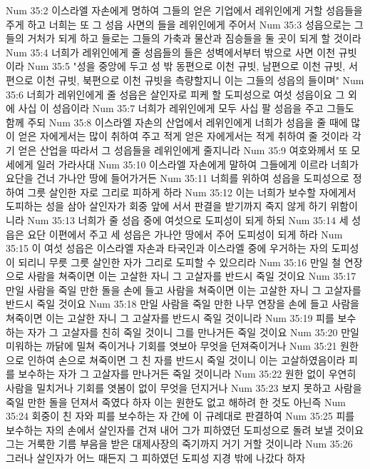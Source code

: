 Num 35:2  이스라엘 자손에게 명하여 그들의 얻은 기업에서 레위인에게 거할 성읍들을 주게 하고 너희는 또 그 성읍 사면의 들을 레위인에게 주어서
Num 35:3  성읍으로는 그들의 거처가 되게 하고 들로는 그들의 가축과 물산과 짐승들을 둘 곳이 되게 할 것이라
Num 35:4  너희가 레위인에게 줄 성읍들의 들은 성벽에서부터 밖으로 사면 이천 규빗이라
Num 35:5  "성을 중앙에 두고 성 밖 동편으로 이천 규빗, 남편으로 이천 규빗, 서편으로 이천 규빗, 북편으로 이천 규빗을 측량할지니 이는 그들의 성읍의 들이며"
Num 35:6  너희가 레위인에게 줄 성읍은 살인자로 피케 할 도피성으로 여섯 성읍이요 그 외에 사십 이 성읍이라
Num 35:7  너희가 레위인에게 모두 사십 팔 성읍을 주고 그들도 함께 주되
Num 35:8  이스라엘 자손의 산업에서 레위인에게 너희가 성읍을 줄 때에 많이 얻은 자에게서는 많이 취하여 주고 적게 얻은 자에게서는 적게 취하여 줄 것이라 각기 얻은 산업을 따라서 그 성읍들을 레위인에게 줄지니라
Num 35:9  여호와께서 또 모세에게 일러 가라사대
Num 35:10  이스라엘 자손에게 말하여 그들에게 이르라 너희가 요단을 건너 가나안 땅에 들어가거든
Num 35:11  너희를 위하여 성읍을 도피성으로 정하여 그릇 살인한 자로 그리로 피하게 하라
Num 35:12  이는 너희가 보수할 자에게서 도피하는 성을 삼아 살인자가 회중 앞에 서서 판결을 받기까지 죽지 않게 하기 위함이니라
Num 35:13  너희가 줄 성읍 중에 여섯으로 도피성이 되게 하되
Num 35:14  세 성읍은 요단 이편에서 주고 세 성읍은 가나안 땅에서 주어 도피성이 되게 하라
Num 35:15  이 여섯 성읍은 이스라엘 자손과 타국인과 이스라엘 중에 우거하는 자의 도피성이 되리니 무릇 그릇 살인한 자가 그리로 도피할 수 있으리라
Num 35:16  만일 철 연장으로 사람을 쳐죽이면 이는 고살한 자니 그 고살자를 반드시 죽일 것이요
Num 35:17  만일 사람을 죽일 만한 돌을 손에 들고 사람을 쳐죽이면 이는 고살한 자니 그 고살자를 반드시 죽일 것이요
Num 35:18  만일 사람을 죽일 만한 나무 연장을 손에 들고 사람을 쳐죽이면 이는 고살한 자니 그 고살자를 반드시 죽일 것이니라
Num 35:19  피를 보수하는 자가 그 고살자를 친히 죽일 것이니 그를 만나거든 죽일 것이요
Num 35:20  만일 미워하는 까닭에 밀쳐 죽이거나 기회를 엿보아 무엇을 던져죽이거나
Num 35:21  원한으로 인하여 손으로 쳐죽이면 그 친 자를 반드시 죽일 것이니 이는 고살하였음이라 피를 보수하는 자가 그 고살자를 만나거든 죽일 것이니라
Num 35:22  원한 없이 우연히 사람을 밀치거나 기회를 엿봄이 없이 무엇을 던지거나
Num 35:23  보지 못하고 사람을 죽일 만한 돌을 던져서 죽였다 하자 이는 원한도 없고 해하려 한 것도 아닌즉
Num 35:24  회중이 친 자와 피를 보수하는 자 간에 이 규례대로 판결하여
Num 35:25  피를 보수하는 자의 손에서 살인자를 건져 내어 그가 피하였던 도피성으로 돌려 보낼 것이요 그는 거룩한 기름 부음을 받은 대제사장의 죽기까지 거기 거할 것이니라
Num 35:26  그러나 살인자가 어느 때든지 그 피하였던 도피성 지경 밖에 나갔다 하자
